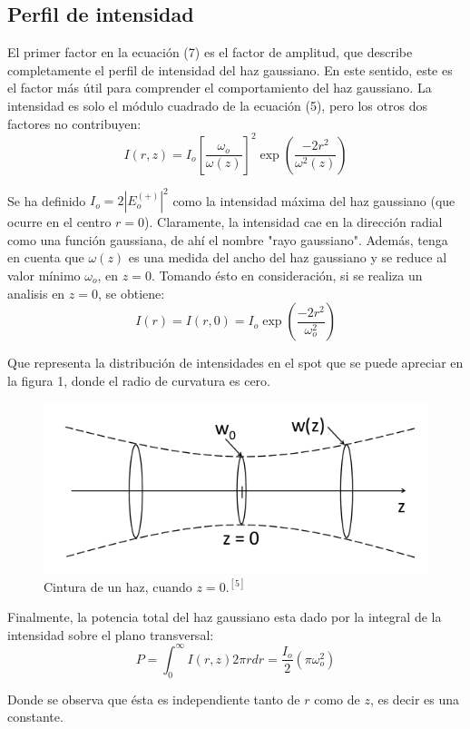 \documentclass[11pt,letterpaper,twocolumn]{article}
\begin{document}
\subsection*{Perfil de intensidad}
El primer factor en la ecuación (7) es el factor de amplitud, que describe completamente el perfil de intensidad del haz gaussiano. En este sentido, este es el factor más útil para comprender el comportamiento del haz gaussiano. La intensidad es solo el módulo cuadrado de la ecuación (5), pero los otros dos factores no contribuyen:
\begin{equation}
I(r,z)=I_{o}\left[\dfrac{\omega_{o}}{\omega (z)}\right]^{2} \exp\left( \dfrac{-2r^{2}}{\omega^{2}(z)}\right)
\end{equation}
\par 
Se ha definido $I_{o}= 2|E_{o}^{(+)}|^{2}$ como la intensidad máxima del haz gaussiano (que ocurre en el centro $r=0$). Claramente, la intensidad cae en la dirección radial como una función gaussiana, de ahí el nombre "rayo gaussiano". Además, tenga en cuenta que $\omega(z)$ es una medida del ancho del haz gaussiano y se reduce al valor mínimo $\omega_{o}$, en $z=0$. Tomando ésto en consideración, si se realiza un analisis en $z=0$, se obtiene: 
\begin{equation}
I(r)=I(r,0)=I_{o} \exp\left(\dfrac{-2r^{2}}{\omega_{o}^{2}}\right)
\label{inten}
\end{equation}
\par 
Que representa la distribución de intensidades en el spot que se puede apreciar en la figura 1, donde el radio de curvatura es cero.
\begin{figure}[h!]
\begin{center}
\includegraphics[scale=0.4]{spot.png}
\caption{Cintura de un haz, cuando $z=0$.$^{[5]}$}
\end{center}
\end{figure}
\par 
Finalmente, la potencia total del haz gaussiano esta dado por la integral de la intensidad sobre el plano transversal: 
\begin{equation}
P= \int_{0}^{\infty} I(r,z)2 \pi r dr= \dfrac{I_{o}}{2}\left(\pi \omega_{o}^2\right)
\end{equation}
\par 
Donde se observa que ésta es independiente tanto de $r$ como de $z$, es decir es una constante. 
\end{document}
